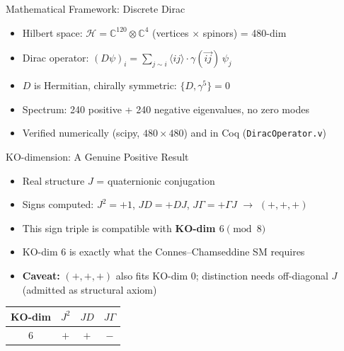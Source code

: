 \documentclass[aspectratio=169,11pt]{beamer}
\begin{document}
\begin{frame}{Mathematical Framework: Discrete Dirac}
  \begin{itemize}
    \item Hilbert space: $\mathcal{H} = \mathbb{C}^{120} \otimes \mathbb{C}^4$ (vertices $\times$ spinors) = 480-dim
    \item Dirac operator: $(D\psi)_i = \sum_{j \sim i} \langle i j \rangle \cdot \gamma(\overrightarrow{ij})\, \psi_j$
    \item $D$ is Hermitian, chirally symmetric: $\{D, \gamma^5\} = 0$
    \item Spectrum: 240 positive + 240 negative eigenvalues, no zero modes
    \item Verified numerically (scipy, $480\times480$) and in Coq (\texttt{DiracOperator.v})
  \end{itemize}
  \vfill
  \begin{center}
  \end{center}
\end{frame}

\begin{frame}{KO-dimension: A Genuine Positive Result}
  \begin{itemize}
    \item Real structure $J$ = quaternionic conjugation
    \item Signs computed: $J^2 = +1$, $JD = +DJ$, $J\Gamma = +\Gamma J$ $\to$ $(+,+,+)$
    \item This sign triple is compatible with \textbf{KO-dim $6 \pmod 8$}
    \item KO-dim 6 is exactly what the Connes--Chamseddine SM requires
    \item \textbf{Caveat:} $(+,+,+)$ also fits KO-dim 0; distinction needs off-diagonal $J$ (admitted as structural axiom)
  \end{itemize}
  \vfill
  \begin{center}
    \begin{tabular}{cccc}
      \toprule
      KO-dim & $J^2$ & $JD$ & $J\Gamma$ \\
      \midrule
      6 & $+$ & $+$ & $-$ \\
      \bottomrule
    \end{tabular}
  \end{center}
\end{frame}
\end{document}
